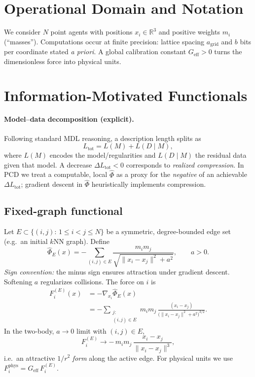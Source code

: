 \documentclass[11pt,a4paper]{article}
\numberwithin{equation}{section}
\newcommand{\R}{\mathbb{R}}
\begin{document}
\section{Operational Domain and Notation}
We consider $N$ point agents with positions $x_i\in\R^3$ and positive weights $m_i$ (``masses''). Computations occur at finite precision: lattice spacing $a_{\text{grid}}$ and $b$ bits per coordinate stated \emph{a priori}. A global calibration constant $G_{\text{eff}}>0$ turns the dimensionless force into physical units.

\section{Information-Motivated Functionals}

\paragraph{Model--data decomposition (explicit).}
Following standard MDL reasoning, a description length splits as
\begin{equation}
\label{eq:Ltot}
L_{\text{tot}} = L(M) + L(D\mid M),
\end{equation}
where $L(M)$ encodes the model/regularities and $L(D\mid M)$ the residual data given that model. A decrease $\Delta L_{\text{tot}}<0$ corresponds to \emph{realized compression}. In PCD we treat a computable, local $\widehat{\Phi}$ as a proxy for the \emph{negative} of an achievable $\Delta L_{\text{tot}}$; gradient descent in $\widehat{\Phi}$ heuristically implements compression.

\subsection{Fixed-graph functional}
Let $E\subset\{(i,j):\,1\le i<j\le N\}$ be a symmetric, degree-bounded edge set (e.g.\ an initial $k$NN graph). Define
\begin{equation}
\label{eq:phiE}
\widehat{\Phi}_E(x)= -\sum_{(i,j)\in E} \frac{m_im_j}{\sqrt{\lVert x_i-x_j\rVert^2+a^2}},
\qquad a>0.
\end{equation}
\emph{Sign convention:} the minus sign ensures attraction under gradient descent. Softening $a$ regularizes collisions. The force on $i$ is
\begin{align}
\label{eq:forceE}
F^{(E)}_i(x) 
&= -\nabla_{x_i}\widehat{\Phi}_E(x) \nonumber\\
&= -\sum_{\substack{j:\\(i,j)\in E}} 
m_im_j\,\frac{(x_i-x_j)}{\big(\lVert x_i-x_j\rVert^2+a^2\big)^{3/2}}.
\end{align}
In the two-body, $a\to0$ limit with $(i,j)\in E$,
\begin{equation}
\label{eq:twoBody}
F^{(E)}_i \to -\,m_im_j\,\frac{x_i-x_j}{\lVert x_i-x_j\rVert^3},
\end{equation}
i.e.\ an attractive $1/r^2$ \emph{form} along the active edge. For physical units we use $F^{\text{phys}}_i=G_{\text{eff}}\,F^{(E)}_i$.
\end{document}
